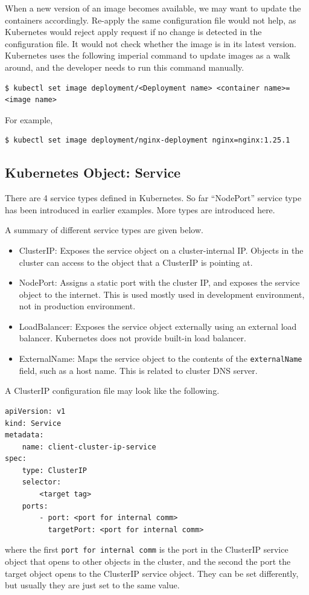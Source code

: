 When a new version of an image becomes available, we may want to update the containers accordingly. Re-apply the same configuration file would not help, as Kubernetes would reject apply request if no change is detected in the configuration file. It would not check whether the image is in its latest version. Kubernetes uses the following imperial command to update images as a walk around, and the developer needs to run this command manually.
\begin{lstlisting}
$ kubectl set image deployment/<Deployment name> <container name>=<image name>
\end{lstlisting}
For example,
\begin{lstlisting}
$ kubectl set image deployment/nginx-deployment nginx=nginx:1.25.1
\end{lstlisting}

\subsection{Kubernetes Object: Service} \label{ch:vac:subsec:k8snetworking}

There are 4 service types defined in Kubernetes. So far ``NodePort'' service type has been introduced in earlier examples. More types are introduced here.

A summary of different service types are given below.
\begin{itemize}
	\item ClusterIP: Exposes the service object on a cluster-internal IP. Objects in the cluster can access to the object that a ClusterIP is pointing at.
	\item NodePort: Assigns a static port with the cluster IP, and exposes the service object to the internet. This is used mostly used in development environment, not in production environment.
	\item LoadBalancer: Exposes the service object externally using an external load balancer. Kubernetes does not provide built-in load balancer.
	\item ExternalName: Maps the service object to the contents of the \verb|externalName| field, such as a host name. This is related to cluster DNS server.
\end{itemize}

A ClusterIP configuration file may look like the following.
\begin{lstlisting}
apiVersion: v1
kind: Service
metadata:
	name: client-cluster-ip-service
spec:
	type: ClusterIP
	selector:
		<target tag>
	ports:
		- port: <port for internal comm>
		  targetPort: <port for internal comm>
\end{lstlisting}
where the first \verb|port for internal comm| is the port in the ClusterIP service object that opens to other objects in the cluster, and the second the port the target object opens to the ClusterIP service object. They can be set differently, but usually they are just set to the same value.


